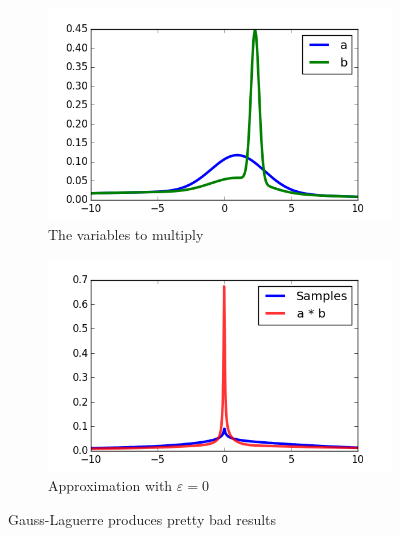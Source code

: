 \documentclass[11pt,a4paper]{book}
\begin{document}
\begin{figure}[h]
  \centering
  \begin{subfigure}[t]{0.45\textwidth}
    \centering
    \includegraphics[width=\textwidth]{thesis/operations/product-laguerre-vars}
    \caption{The variables to multiply}
  \end{subfigure}
  \hfill
  \begin{subfigure}[t]{0.45\textwidth}
    \centering
    \includegraphics[width=\textwidth]{thesis/operations/product-laguerre-0}
    \caption{Approximation with $\varepsilon = 0$}
  \end{subfigure}
  \caption{Gauss-Laguerre produces pretty bad results}
  \label{fig:product-laguerre}
\end{figure}
\end{document}
